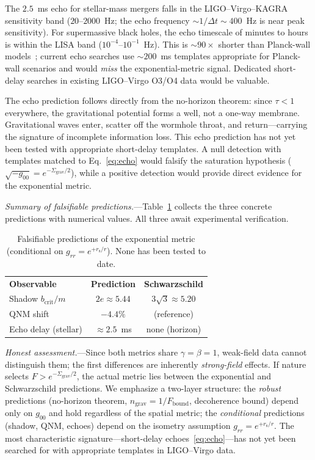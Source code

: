 \documentclass[prl,twocolumn,superscriptaddress,longbibliography,floatfix]{revtex4-2}
\newcommand{\tauasym}{\tau}
\newcommand{\rs}{r_{\mathrm{s}}}
\newcommand{\Sgrav}{\Sigma_{\mathrm{grav}}}
\newcommand{\Fbound}{F_{\mathrm{bound}}}
\newcommand{\nref}{n_{\mathrm{grav}}}
\begin{document}
The $2.5$~ms echo for stellar-mass mergers falls in
the LIGO--Virgo--KAGRA sensitivity band
($20$--$2000$~Hz; the echo frequency
$\sim 1/\Delta t \sim 400$~Hz is near peak sensitivity).
For supermassive black holes, the echo timescale of
minutes to hours is within the LISA band
($10^{-4}$--$10^{-1}$~Hz).
This is $\sim 90\times$ shorter than Planck-wall
models~\cite{Cardoso2016}; current echo searches use
$\sim 200$~ms templates appropriate for Planck-wall
scenarios and would \emph{miss} the exponential-metric
signal.
Dedicated short-delay searches in existing
LIGO--Virgo O3/O4 data would be valuable.

The echo prediction follows directly from the no-horizon
theorem: since $\tauasym < 1$ everywhere, the
gravitational potential forms a well, not a one-way
membrane.
Gravitational waves enter, scatter off the wormhole
throat, and return---carrying the signature of
incomplete information loss.
This echo prediction has not yet been tested with
appropriate short-delay templates.
A null detection with templates matched to
Eq.~\eqref{eq:echo} would falsify the saturation
hypothesis ($\sqrt{-g_{00}} = e^{-\Sgrav/2}$), while
a positive detection would provide direct evidence
for the exponential metric.

\emph{Summary of falsifiable predictions.}---Table~\ref{tab:predictions_summary}
collects the three concrete predictions with numerical values.
All three await experimental verification.

\begin{table}[t]
\caption{\label{tab:predictions_summary}%
Falsifiable predictions of the exponential metric
(conditional on $g_{rr} = e^{+\rs/r}$).
None has been tested to date.}
\begin{ruledtabular}
\begin{tabular}{lcc}
  \textbf{Observable} & \textbf{Prediction}
    & \textbf{Schwarzschild} \\
  \colrule
  Shadow $b_{\text{crit}}/m$ & $2e \approx 5.44$
    & $3\sqrt{3} \approx 5.20$ \\
  QNM shift & $-4.4\%$ & (reference) \\
  Echo delay (stellar) & $\approx 2.5$~ms
    & none (horizon) \\
\end{tabular}
\end{ruledtabular}
\end{table}

\emph{Honest assessment.}---Since both metrics share
$\gamma = \beta = 1$, weak-field data cannot
distinguish them; the first differences are
inherently \emph{strong-field} effects.
If nature selects $F > e^{-\Sgrav/2}$, the actual
metric lies between the exponential and Schwarzschild
predictions.
We emphasize a two-layer structure:
the \emph{robust} predictions (no-horizon theorem,
$\nref = 1/\Fbound$, decoherence bound) depend only on
$g_{00}$ and hold regardless of the spatial metric;
the \emph{conditional} predictions (shadow, QNM,
echoes) depend on the isometry assumption
$g_{rr} = e^{+\rs/r}$.
The most characteristic signature---short-delay
echoes~\eqref{eq:echo}---has not yet been searched
for with appropriate templates in LIGO--Virgo data.
\end{document}
